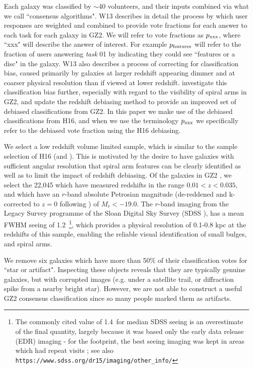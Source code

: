 \documentclass[usenatbib]{mn2e}
\begin{document}
Each galaxy was classified by $\sim$40 volunteers, and their inputs combined via what we call ``consensus algorithms". W13 describes in detail the process by which user responses are weighted and combined to provide vote fractions for each answer to each task for each galaxy in GZ2. We will refer to vote fractions as $p_{\rm xxx}$, where ``xxx" will describe the answer of interest. For example $p_{\rm features}$ will refer to the fraction of users answering {\it task} 01 by indicating they could see ``features or a disc" in the galaxy. W13 also describes a process of correcting for classification bias, caused primarily by galaxies at larger redshift appearing dimmer and at coarser physical resolution than if viewed at lower redshift. \citet[hereafter H16]{Hart2016} investigate this classification bias further, especially with regard to the visibility of spiral arms in GZ2, and update the redshift debiasing method to provide an improved set of debiased classifications from GZ2. In this paper we make use of the debiased classifications from H16, and when we use the terminology $p_{\rm xxx}$ we specifically refer to the debiased vote fraction using the H16 debiasing.

We select a low redshift volume limited sample, which is similar to the sample selection of H16 (and \citealt{Hart2017a}). This is motivated by the desire to have galaxies with sufficient angular resolution that spiral arm features can be clearly identified as well as to limit the impact of redshift debiasing.  Of the galaxies in GZ2 \citep{DR7,Strauss2002}, we select the 22,045 which have measured redshifts in the range $0.01<z<0.035$, and which have an $r$-band absolute Petrosian magnitude (de-reddened and k-corrected to $z=0$ following \citealt{Bamford2009}) of $M_r < -19.0$. The $r$-band imaging from the Legacy Survey programme of the Sloan Digital Sky Survey (SDSS \citealt{York2000}), has a mean FWHM seeing of 1.2\arcsec ~\citep{Kruk2018}\footnote{The commonly cited value of 1.4\arcsec ~for median SDSS seeing is an overestimate of the final quantity, largely because it was based only the early data release (EDR) imaging -  for the 
 footprint, the best seeing imaging was kept in areas which had repeat visits \citep{Ross2011}; see also {\tt https://www.sdss.org/dr15/imaging/other\_info/}}, which provides a physical resolution of 0.1-0.8 kpc at the redshifts of this sample, enabling the reliable visual identification of small bulges, and spiral arms. 

 We remove {six} galaxies which have more than 50\% of their classification votes for ``star or artifact". Inspecting these objects reveals that they are typically genuine galaxies, but with corrupted images (e.g. under a satellite trail, or diffraction spike from a nearby bright star). However, we are not able to construct a useful GZ2 consensus classification since so many people marked them as artifacts.
\end{document}
